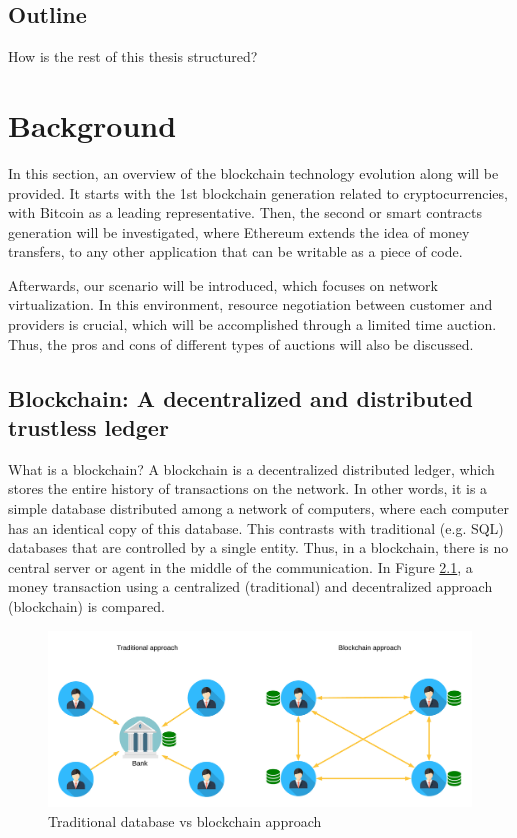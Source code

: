 \section{Outline}

How is the rest of this thesis structured?


\chapter{Background}
\label{ch:background}

In this section, an overview of the blockchain technology evolution along will be provided. It starts with the 1st blockchain generation related to cryptocurrencies, with Bitcoin as a leading representative. Then, the second or smart contracts generation will be investigated, where Ethereum extends the idea of money transfers, to any other application that can be writable as a piece of code.

Afterwards, our scenario will be introduced, which focuses on network virtualization. In this environment, resource negotiation between customer and providers is crucial, which will be accomplished through a limited time auction. Thus, the pros and cons of different types of auctions will also be discussed.

\section{Blockchain: A decentralized and distributed trustless ledger}

What is a blockchain? A blockchain is a decentralized distributed ledger, which stores the entire history of transactions on the network. In other words, it is a simple database distributed among a network of computers, where each computer has an identical copy of this database. This contrasts with traditional (e.g. SQL) databases that are controlled by a single entity. Thus, in a blockchain, there is no central server or agent in the middle of the communication. In Figure \ref{fig:CentralizedvsDecentralized}, a money transaction using a centralized (traditional) and decentralized approach (blockchain) is compared.

\begin{figure}[h]
  \centering
  	\includegraphics[scale=0.6]{gfx/cenVsDec.png}
  \caption{Traditional database vs blockchain approach}
  \label{fig:CentralizedvsDecentralized}
\end{figure}


